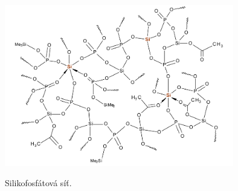 \documentclass[
  printed, %
  table,   %
  lof,     %
  lot,     %
  oneside,
]{fithesis3}
\begin{document}
\begin{otherlanguage}{czech}

\begin{figure}[h!]
\caption{Silikofosfátová síť. \cite{Styskalik2015thesis} }
  \center
  \includegraphics[width=10cm]{si_polymer_cely.png}
  \label{si_polymer_cely}
  \end{figure}



\end{otherlanguage}
\end{document}
